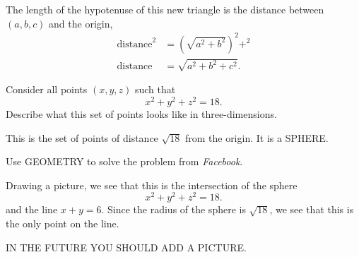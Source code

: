 \documentclass[noauthor,nooutcomes,handout]{ximera}
\begin{document}
\begin{question}
\begin{freeResponse}
\begin{enumerate}
\begin{center}
    \end{center}
    The length of the hypotenuse of this new triangle is the distance
    between $(a,b,c)$ and the origin,
    \begin{align*}
      \text{distance}^2&= \left(\sqrt{a^2+b^2}\right)^2 + ^2\\
       \text{distance}&=  \sqrt{a^2+b^2 + c^2}.
    \end{align*}
    \end{enumerate}
  \end{freeResponse}
\end{question}
\mynewpage


\begin{question}
  Consider all points $(x,y,z)$ such that
  \[
  x^2 + y^2 + z^2 = 18.
  \]
  Describe what this set of points looks like in three-dimensions.
  \begin{freeResponse}
    This is the set of points of distance $\sqrt{18}$ from the
    origin. It is a SPHERE.
  \end{freeResponse}
\end{question}
\mynewpage


\begin{question}
  Use GEOMETRY to solve the problem from \textsl{Facebook}.
  \begin{freeResponse}
    Drawing a picture, we see that this is the intersection of the sphere
      \[
      x^2 + y^2 + z^2 = 18.
      \]
      and the line $x+y=6$. Since the radius of the sphere is
      $\sqrt{18}$, we see that this is the only point on the line.

      IN THE FUTURE YOU SHOULD ADD A PICTURE.
  \end{freeResponse}
\end{question}
\end{document}
